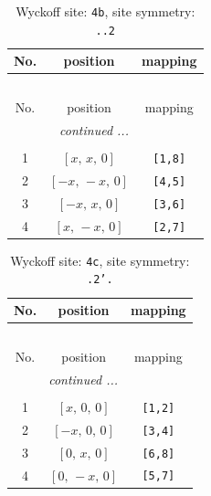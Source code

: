 \documentclass[fleqn,8pt]{jsarticle}
\begin{document}
\begin{longtable}{ccc}
\caption{Wyckoff site: {\tt 4b}, site symmetry: {\tt ..2}}
 \\
 \hline \hline
No. & position & mapping \\ \hline \endfirsthead

\multicolumn{2}{l}{\tablename\ \thetable{}} \\
 \hline \hline
No. & position & mapping \\ \hline \endhead

 \hline \hline
\multicolumn{2}{r}{\footnotesize\it continued ...} \\ \endfoot

 \hline \hline
\multicolumn{2}{r}{} \\ \endlastfoot

1 & $\left[ x,\, x,\, 0 \right]$ & {\tt [1,8]} \\ \hline
2 & $\left[ - x,\, - x,\, 0 \right]$ & {\tt [4,5]} \\ \hline
3 & $\left[ - x,\, x,\, 0 \right]$ & {\tt [3,6]} \\ \hline
4 & $\left[ x,\, - x,\, 0 \right]$ & {\tt [2,7]} \\
\end{longtable}
\renewcommand{\arraystretch}{1.2}
\begin{longtable}{ccc}
\caption{Wyckoff site: {\tt 4c}, site symmetry: {\tt .2'.}}
 \\
 \hline \hline
No. & position & mapping \\ \hline \endfirsthead

\multicolumn{2}{l}{\tablename\ \thetable{}} \\
 \hline \hline
No. & position & mapping \\ \hline \endhead

 \hline \hline
\multicolumn{2}{r}{\footnotesize\it continued ...} \\ \endfoot

 \hline \hline
\multicolumn{2}{r}{} \\ \endlastfoot

1 & $\left[ x,\, 0,\, 0 \right]$ & {\tt [1,2]} \\ \hline
2 & $\left[ - x,\, 0,\, 0 \right]$ & {\tt [3,4]} \\ \hline
3 & $\left[ 0,\, x,\, 0 \right]$ & {\tt [6,8]} \\ \hline
4 & $\left[ 0,\, - x,\, 0 \right]$ & {\tt [5,7]} \\
\end{longtable}
\renewcommand{\arraystretch}{1.2}
\end{document}
